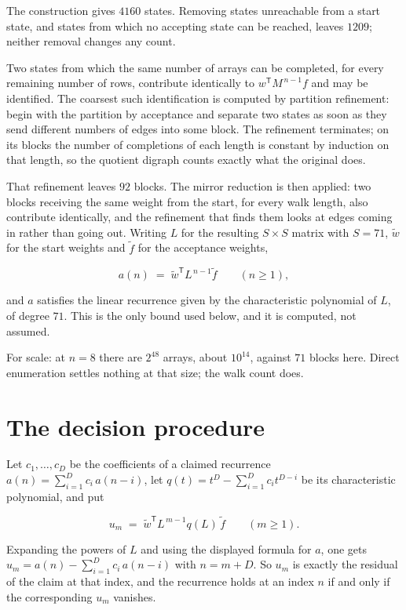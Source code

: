 \documentclass[11pt]{article}
\theoremstyle{definition}
\begin{document}
The construction gives $4160$ states. Removing states unreachable from a start state, and states from which no accepting state can be reached, leaves $1209$; neither removal changes any count.

Two states from which the same number of arrays can be completed, for every remaining number of rows, contribute identically to $w^{\mathsf T}M^{\,n-1}f$ and may be identified. The coarsest such identification is computed by partition refinement: begin with the partition by acceptance and separate two states as soon as they send different numbers of edges into some block. The refinement terminates; on its blocks the number of completions of each length is constant by induction on that length, so the quotient digraph counts exactly what the original does.

That refinement leaves $92$ blocks. The mirror reduction is then applied: two blocks receiving the same weight from the start, for every walk length, also contribute identically, and the refinement that finds them looks at edges coming in rather than going out. Writing $L$ for the resulting $S \times S$ matrix with $S = 71$, $\tilde w$ for the start weights and $\tilde f$ for the acceptance weights,

\[a(n) \;=\; \tilde w^{\mathsf T} L^{\,n-1} \tilde f \qquad (n \ge 1),\]

and $a$ satisfies the linear recurrence given by the characteristic polynomial of $L$, of degree $71$. This is the only bound used below, and it is computed, not assumed.

For scale: at $n = 8$ there are $2^{48}$ arrays, about $10^{14}$, against $71$ blocks here. Direct enumeration settles nothing at that size; the walk count does.

\section{The decision procedure}

Let $c_1,\dots,c_D$ be the coefficients of a claimed recurrence $a(n) = \sum_{i=1}^{D} c_i\,a(n-i)$, let $q(t) = t^{D} - \sum_{i=1}^{D} c_i t^{D-i}$ be its characteristic polynomial, and put

\[u_m \;=\; \tilde w^{\mathsf T} L^{\,m-1} q(L)\,\tilde f \qquad (m \ge 1).\]

Expanding the powers of $L$ and using the displayed formula for $a$, one gets $u_m = a(n) - \sum_{i=1}^{D} c_i\,a(n-i)$ with $n = m + D$. So $u_m$ is exactly the residual of the claim at that index, and the recurrence holds at an index $n$ if and only if the corresponding $u_m$ vanishes.
\end{document}
